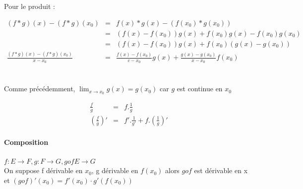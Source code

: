 			Pour le produit :
			
			$\begin{array}{rcl}
				(f*g)(x) - (f*g)(x_0) &=& f(x)*g(x) - (f(x_0)*g(x_0)) \\
																							   &=& (f(x)-f(x_0))g(x) + f(x_0)g(x) - f(x_0)g(x_0) \\
																							   &=& (f(x)-f(x_0))g(x) + f(x_0)(g(x) -g(x_0))\\
				\frac{(f*g)(x)-(f*g)(x_0)}{x-x_0} &=& \frac{f(x) - f(x_0)}{c-x_0}g(x) + \frac{g(x) - g(x_0)}{x-x_0}f(x_0)
			\end{array}$
			~\\
			~\\
			Comme précédemment, $\lim_{x \to x_0}{g(x)} = g(x_0)$ car $g$ est continue en $x_0$

			\[\begin{array}{rcl}
					\frac{f}{g} &=& f . \frac{1}{g} \\
					(\frac{f}{g})' &=& f'.\frac{1}{g'} + f.(\frac{1}{g})'
				\end{array}
			\]

			\paragraph{Composition} $f:E \rightarrow F, g : F \rightarrow G, gof E \rightarrow G$ ~\\
			On suppose f dérivable en $x_0$, g dérivable en $f(x_0)$ alors $gof$ est dérivable en x et $(gof)'(x_0) = f'(x_0)\cdot g'(f(x_0))$
